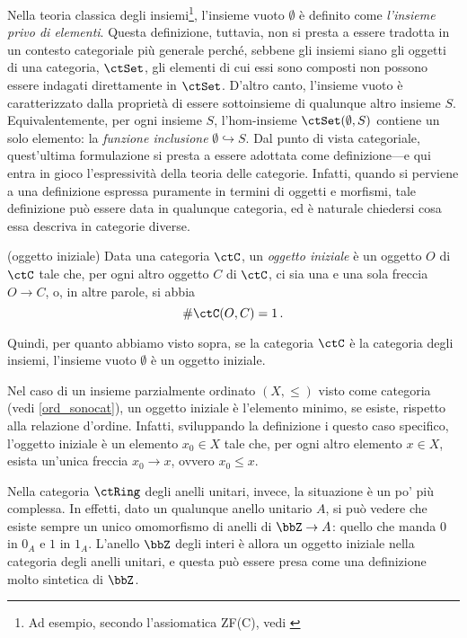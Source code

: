 \color{red}
Nella teoria classica degli insiemi\footnote{Ad esempio, secondo l'assiomatica ZF(C), vedi \cite{ZFC}}, l'insieme vuoto \(\emptyset\) è definito come \emph{l'insieme privo di elementi}. Questa definizione, tuttavia, non si presta a essere tradotta in un contesto categoriale più generale perché, sebbene gli insiemi siano gli oggetti di una categoria, \(\ctSet\), gli elementi di cui essi sono composti non possono essere indagati direttamente in \(\ctSet\). D'altro canto, l'insieme vuoto è caratterizzato dalla  proprietà di essere sottoinsieme di qualunque altro insieme \(S\). Equivalentemente, per ogni insieme \(S\), l'hom-insieme \(\Hom\ctSet(\emptyset,S)\) contiene un solo elemento: la  \emph{funzione inclusione}  \(\emptyset \hookrightarrow S\). Dal punto di vista categoriale, quest'ultima formulazione si presta a essere adottata come definizione---e qui entra in gioco l'espressività della teoria delle categorie. Infatti, quando si perviene a una definizione espressa puramente in termini di oggetti e morfismi,  tale definizione può essere data in qualunque categoria, ed è naturale chiedersi cosa essa descriva in categorie diverse.

\begin{example}(oggetto iniziale)\label{ex_oggetto_iniziale}
	Data una categoria \(\ctC\), un \emph{oggetto iniziale} è un oggetto \(O\) di \(\ctC\) tale che, per ogni altro oggetto \(C\) di \(\ctC\), ci sia una e una sola freccia \(O\to C\), o, in altre parole, si abbia
	\begin{equation}\label{def_oggetto_iniziale}
		\#\Hom\ctC(O,C)=1\,.
	\end{equation}

	Quindi, per quanto abbiamo visto sopra, se la categoria \(\ctC\) è la categoria degli insiemi, l'insieme vuoto \(\emptyset\)  è un oggetto iniziale.

	Nel caso di un insieme parzialmente ordinato \((X, \leqslant)\) visto come categoria (vedi \ref{ord_sonocat}), un oggetto iniziale è l'elemento minimo, se esiste, rispetto alla relazione d'ordine. Infatti, sviluppando la definizione i questo caso specifico, l'oggetto iniziale è un elemento \(x_0\in X\) tale che, per ogni altro elemento \(x\in X\), esista un'unica freccia \(x_0\to x\), ovvero \(x_0\leqslant x\).

	Nella categoria \(\ctRing\) degli anelli unitari, invece, la situazione è un po' più complessa. In effetti, dato un qualunque anello  unitario \(A\), si può vedere che esiste sempre un unico omomorfismo di anelli di \(\bbZ\to A\): quello che manda \(0\) in \(0_A\) e \(1\) in \(1_A\). L'anello \(\bbZ\) degli interi è allora un oggetto iniziale nella categoria degli anelli unitari, e questa può essere presa come una definizione molto sintetica di \(\bbZ\).
\end{example}

